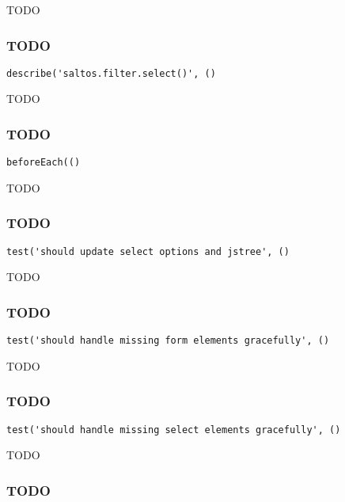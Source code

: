 \documentclass[a4paper]{article}
\begin{document}
TODO

\hypertarget{toc611}{}
\subsubsection{TODO}

\begin{lstlisting}
describe('saltos.filter.select()', ()
\end{lstlisting}

TODO

\hypertarget{toc612}{}
\subsubsection{TODO}

\begin{lstlisting}
beforeEach(()
\end{lstlisting}

TODO

\hypertarget{toc613}{}
\subsubsection{TODO}

\begin{lstlisting}
test('should update select options and jstree', ()
\end{lstlisting}

TODO

\hypertarget{toc614}{}
\subsubsection{TODO}

\begin{lstlisting}
test('should handle missing form elements gracefully', ()
\end{lstlisting}

TODO

\hypertarget{toc615}{}
\subsubsection{TODO}

\begin{lstlisting}
test('should handle missing select elements gracefully', ()
\end{lstlisting}

TODO

\hypertarget{toc616}{}
\subsubsection{TODO}
\end{document}
